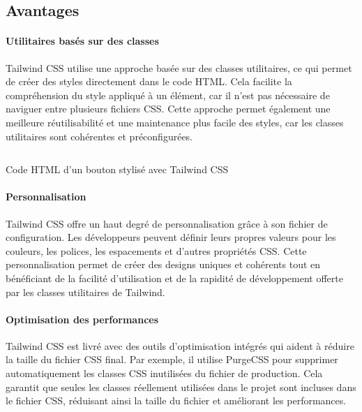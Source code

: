 \subsection{Avantages}

\paragraph{Utilitaires basés sur des classes}

Tailwind CSS utilise une approche basée sur des classes utilitaires, ce qui permet de créer des styles directement dans le code HTML. Cela facilite la compréhension du style appliqué à un élément, car il n'est pas nécessaire de naviguer entre plusieurs fichiers CSS. Cette approche permet également une meilleure réutilisabilité et une maintenance plus facile des styles, car les classes utilitaires sont cohérentes et préconfigurées.

\begin{listing}[H]
    \inputminted{HTML}{assets/code/tailwind-example.html}
    \caption{Code HTML d'un bouton stylisé avec Tailwind CSS\label{fig:tailwind-example}}
\end{listing}

\paragraph{Personnalisation}

Tailwind CSS offre un haut degré de personnalisation grâce à son fichier de configuration. Les développeurs peuvent définir leurs propres valeurs pour les couleurs, les polices, les espacements et d'autres propriétés CSS. Cette personnalisation permet de créer des designs uniques et cohérents tout en bénéficiant de la facilité d'utilisation et de la rapidité de développement offerte par les classes utilitaires de Tailwind.

\paragraph{Optimisation des performances}

Tailwind CSS est livré avec des outils d'optimisation intégrés qui aident à réduire la taille du fichier CSS final. Par exemple, il utilise PurgeCSS pour supprimer automatiquement les classes CSS inutilisées du fichier de production. Cela garantit que seules les classes réellement utilisées dans le projet sont incluses dans le fichier CSS, réduisant ainsi la taille du fichier et améliorant les performances.

